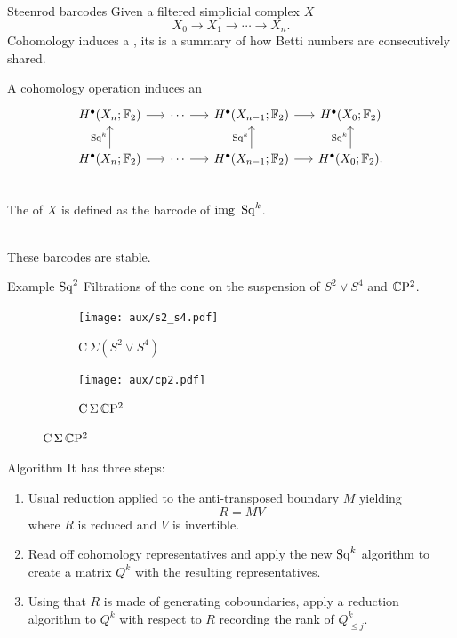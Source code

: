 \begin{frame}[fragile]{Steenrod barcodes}
	Given a filtered simplicial complex $X$
	\[
	X_0 \to X_1 \to \cdots \to X_n.
	\]
	Cohomology induces a , its  is a summary of how Betti numbers are consecutively shared.

	\smallskip
	A cohomology operation induces an 
	\[
	\begin{tikzcd}[column sep = 15]
	H^\bullet(X_n; \Ftwo) \arrow[r] & \cdots \arrow[r] & H^\bullet(X_{n-1}; \Ftwo) \arrow[r] & H^\bullet(X_0; \Ftwo) \\
	H^\bullet(X_n; \Ftwo) \arrow[u, "\Sq^k"] \arrow[r] & \cdots \arrow[r] & H^\bullet(X_{n-1}; \Ftwo) \arrow[u, "\Sq^k"] \arrow[r] & H^\bullet(X_0; \Ftwo) \arrow[u, "\Sq^k"].
	\end{tikzcd}
	\]

	\pause
	 \\
	The  of $X$ is defined as the barcode of $\mathrm{img}\ \Sq^k$.

	\pause\medskip
	 \\
	These barcodes are stable.
\end{frame}

\begin{frame}{Example $\operatorname{Sq}^2$} \pause
	Filtrations of the cone on the suspension of $S^2 \vee S^4$ and $\mathbb{C} \mathrm{P}^2$.

	\pause
	\begin{figure}
		\centering
		\begin{subfigure}[b]{0.49\textwidth}
			\centering
			\texttt{[image: aux/s2\_s4.pdf]}
			\caption{$\mathrm C\,\Sigma(S^2 \vee S^4)$}
			\label{f:s2_s4}
		\end{subfigure}
		\begin{subfigure}[b]{0.49\textwidth}
			\centering
			\texttt{[image: aux/cp2.pdf]}
			\caption{$\mathrm C\,\Sigma\,\mathbb{C}\mathrm{P}^2$}
			\label{f:cp2}
		\end{subfigure}
	\end{figure}
\end{frame}

\begin{frame}{Algorithm}
	\pause
	It has three steps:

	\begin{enumerate}
		\pause\bigskip
		\item Usual reduction applied to the anti-transposed boundary $M$ yielding
		\[
		R = M V
		\]
		where $R$ is reduced and $V$ is invertible.

		\pause\bigskip
		\item Read off cohomology representatives and apply the new $\operatorname{Sq}^k$ algorithm to create a matrix $Q^k$ with the resulting representatives.

		\pause\bigskip
		\item Using that $R$ is made of generating coboundaries, apply a reduction algorithm to $Q^k$ with respect to $R$ recording the rank of $Q_{\leq j}^k$.
	\end{enumerate}
\end{frame}

